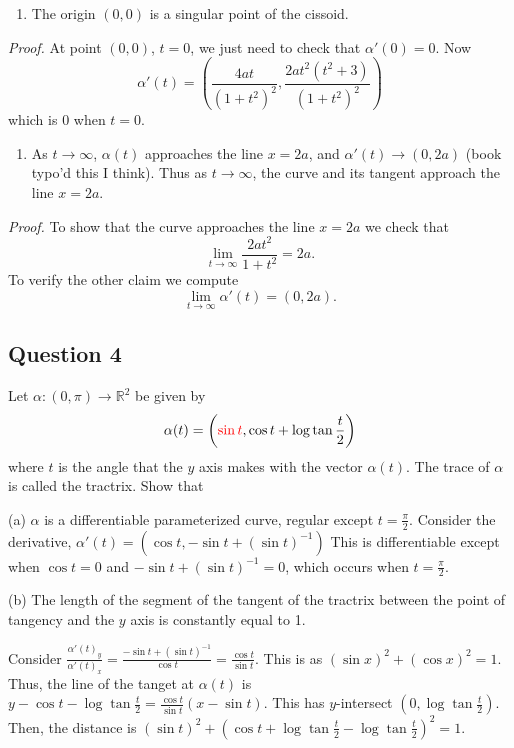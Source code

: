 \documentclass[12pt]{article}
\begin{document}
\begin{enumerate}
\def\labelenumi{\alph{enumi}.}
\setcounter{enumi}{1}
\item
  The origin \((0,0)\) is a singular point of the cissoid.
\end{enumerate}

\emph{Proof.} At point \((0,0)\), \(t = 0\), we just need to check that
\(\alpha'(0) = 0\). Now
\[ \alpha'(t) = \left( \frac{4a t}{(1+t^2)^2}, \frac{2a t^2(t^2 + 3)}{(1+t^2)^2}  \right) \]
which is \(0\) when \(t = 0\).

\begin{enumerate}
\def\labelenumi{\alph{enumi}.}
\setcounter{enumi}{2}
\item
  As \(t\to\infty\), \(\alpha(t)\) approaches the line \(x = 2a\), and
  \(\alpha'(t) \to (0, 2a)\) (book typo'd this I think). Thus as
  \(t\to\infty\), the curve and its tangent approach the line
  \(x = 2a\).
\end{enumerate}

\emph{Proof.} To show that the curve approaches the line \(x=2a\) we
check that \[ \lim_{t\to\infty} \frac{2at^2}{1+t^2} = 2a. \] To verify
the other claim we compute \[ \lim_{t\to\infty} \alpha'(t) = (0, 2a). \]


\subsection*{Question 4}

Let $\alpha : (0, \pi) \to \mathbb R^2$ be given by
$$\alpha(t) = \left ({\color{red}\sin t}, \cos t + \log \tan \frac t2\right )$$
where $t$ is the angle that the $y$ axis makes with the vector $\alpha(t)$. The trace of $\alpha$ is
called the tractrix. 
Show that

(a) $\alpha$ is a differentiable parameterized curve, regular except $t = \frac \pi2$.
Consider the derivative, $\alpha'(t) = \left (\cos t, -\sin t + (\sin t)^{-1}\right )$
This is differentiable except when $\cos t = 0$ and $-\sin t + (\sin t)^{-1} = 0$, 
which occurs when $t = \frac \pi2$.

(b) The length of the segment of the tangent of the tractrix 
between the point of tangency and the $y$ axis is constantly equal to 1.

Consider $\frac {\alpha'(t)_y}{\alpha'(t)_x} = \frac{-\sin t + (\sin t)^{-1}}{\cos t} = \frac {\cos t}{\sin t}.$ This is as $(\sin x)^2 + (\cos x)^2 = 1.$
Thus, the line of the tanget at $\alpha(t)$ is $y - \cos t - \log \tan \frac t2 = \frac{\cos t}{\sin t}(x - \sin t).$
This has $y$-intersect $(0,\log \tan \frac t2).$ Then, the distance is $(\sin t)^2 + (\cos t + \log \tan \frac t2 - \log \tan \frac t2)^2 = 1.$
\end{document}

